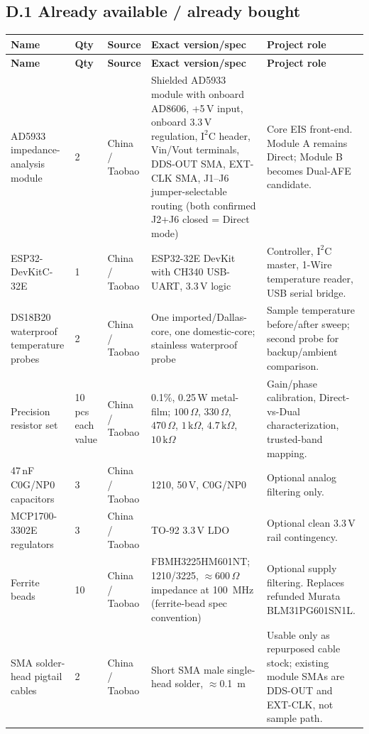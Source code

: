 \documentclass[11pt,a4paper]{article}
\newcommand{\kohm}[1]{\ensuremath{#1\,\mathrm{k}\Omega}}
\newcommand{\Rohm}[1]{\ensuremath{#1\,\Omega}}
\begin{document}
\subsection{D.1 Already available / already bought}

\small
\begin{xltabular}{\textwidth}{L{28mm}L{15mm}L{32mm}L{42mm}Y}
\toprule
\textbf{Name} & \textbf{Qty} & \textbf{Source} & \textbf{Exact version/spec} & \textbf{Project role}\\
\midrule
\endfirsthead
\toprule
\textbf{Name} & \textbf{Qty} & \textbf{Source} & \textbf{Exact version/spec} & \textbf{Project role}\\
\midrule
\endhead

AD5933 impedance-analysis module & 2 & China / Taobao & Shielded AD5933 module with onboard AD8606, +5\,V input, onboard 3.3\,V regulation, $\mathrm{I^2C}$ header, Vin/Vout terminals, DDS-OUT SMA, EXT-CLK SMA, J1--J6 jumper-selectable routing (both confirmed J2+J6 closed = Direct mode) & Core EIS front-end. Module A remains Direct; Module B becomes Dual-AFE candidate.\\
ESP32-DevKitC-32E & 1 & China / Taobao & ESP32-32E DevKit with CH340 USB-UART, 3.3\,V logic & Controller, $\mathrm{I^2C}$ master, 1-Wire temperature reader, USB serial bridge.\\
DS18B20 waterproof temperature probes & 2 & China / Taobao & One imported/Dallas-core, one domestic-core; stainless waterproof probe & Sample temperature before/after sweep; second probe for backup/ambient comparison.\\
Precision resistor set & 10 pcs each value & China / Taobao & 0.1\%, 0.25\,W metal-film; \Rohm{100}, \Rohm{330}, \Rohm{470}, \kohm{1}, \kohm{4.7}, \kohm{10} & Gain/phase calibration, Direct-vs-Dual characterization, trusted-band mapping.\\
47\,nF C0G/NP0 capacitors & 3 & China / Taobao & 1210, 50\,V, C0G/NP0 & Optional analog filtering only.\\
MCP1700-3302E regulators & 3 & China / Taobao & TO-92 3.3\,V LDO & Optional clean 3.3\,V rail contingency.\\
Ferrite beads & 10 & China / Taobao & FBMH3225HM601NT; 1210/3225, $\approx\Rohm{600}$ impedance at \SI{100}{\mega\hertz} (ferrite-bead spec convention) & Optional supply filtering. Replaces refunded Murata BLM31PG601SN1L.\\
SMA solder-head pigtail cables & 2 & China / Taobao & Short SMA male single-head solder, $\approx$\SI{0.1}{\meter} & Usable only as repurposed cable stock; existing module SMAs are DDS-OUT and EXT-CLK, not sample path.\\

\end{xltabular}
\end{document}
